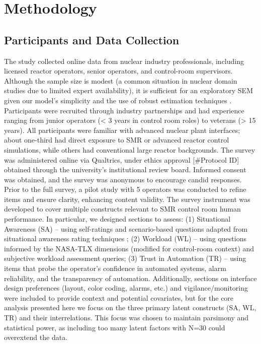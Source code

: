 \documentclass[conference]{IEEEtran}
\begin{document}
\section{Methodology}

\subsection{Participants and Data Collection}
The study collected online data from nuclear industry professionals, including licensed reactor operators, senior operators, and control-room supervisors. Although the sample size is modest (a common situation in nuclear domain studies due to limited expert availability), it is sufficient for an exploratory SEM given our model’s simplicity and the use of robust estimation techniques \cite{taylor1999cutoff}. Participants were recruited through industry partnerships and had experience ranging from junior operators (< 3 years in control room roles) to veterans (> 15 years). All participants were familiar with advanced nuclear plant interfaces; about one-third had direct exposure to SMR or advanced reactor control simulations, while others had conventional large reactor backgrounds. The survey was administered online via Qualtrics, under ethics approval [#Protocol ID] obtained through the university’s institutional review board. Informed consent was obtained, and the survey was anonymous to encourage candid responses. Prior to the full survey, a pilot study with 5 operators was conducted to refine items and ensure clarity, enhancing content validity. The survey instrument was developed to cover multiple constructs relevant to SMR control room human performance. In particular, we designed sections to assess: (1) Situational Awareness (SA) – using self-ratings and scenario-based questions adapted from situational awareness rating techniques \cite{sage1995toward}; (2) Workload (WL) – using questions informed by the NASA-TLX dimensions (modified for control-room context) and subjective workload assessment queries; (3) Trust in Automation (TR) – using items that probe the operator’s confidence in automated systems, alarm reliability, and the transparency of automation. Additionally, sections on interface design preferences (layout, color coding, alarms, etc.) and vigilance/monitoring were included to provide context and potential covariates, but for the core analysis presented here we focus on the three primary latent constructs (SA, WL, TR) and their interrelations. This focus was chosen to maintain parsimony and statistical power, as including too many latent factors with N=30 could overextend the data.
\end{document}
